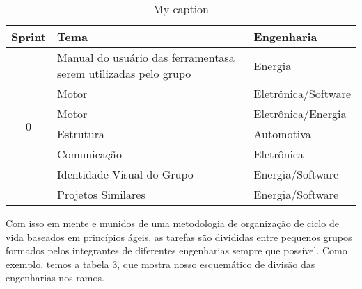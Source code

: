 \begin{table}[!h]
\centering
\caption{My caption}
\label{my-label}
\begin{tabular}{|c|l|l|}
\hline
\multicolumn{1}{|l|}{\textbf{Sprint}} & \textbf{Tema}                                                  & \textbf{Engenharia} \\ \hline
\multirow{7}{*}{0}                    & Manual do usuário das ferramentasa serem utilizadas pelo grupo & Energia             \\ \cline{2-3}
                                      & Motor                                                          & Eletrônica/Software \\ \cline{2-3}
                                      & Motor                                                          & Eletrônica/Energia  \\ \cline{2-3}
                                      & Estrutura                                                      & Automotiva          \\ \cline{2-3}
                                      & Comunicação                                                    & Eletrônica          \\ \cline{2-3}
                                      & Identidade Visual do Grupo                                     & Energia/Software    \\ \cline{2-3}
                                      & Projetos Similares                                             & Energia/Software    \\ \hline
\end{tabular}
\end{table}

Com isso em mente e munidos de uma metodologia de organização de ciclo de vida baseados em princípios ágeis, as tarefas são divididas entre pequenos grupos formados pelos integrantes de diferentes engenharias sempre que possível. Como exemplo, temos a tabela 3, que mostra nosso esquemático de divisão das engenharias nos ramos.

